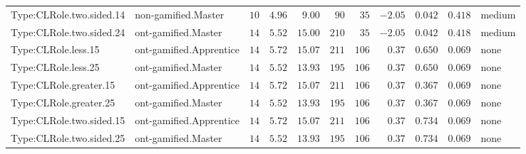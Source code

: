\documentclass[6pt,a4paper]{article}
\begin{document}
{\begin{longtable}{llrrrrrrrrl}
Type:CLRole.two.sided.14&non-gamified.Master&$10$&$4.96$&$ 9.00$&$ 90$&$ 35$&$-2.05$&$0.042$&$0.418$&medium\tabularnewline
Type:CLRole.two.sided.24&ont-gamified.Master&$14$&$5.52$&$15.00$&$210$&$ 35$&$-2.05$&$0.042$&$0.418$&medium\tabularnewline
Type:CLRole.less.15&ont-gamified.Apprentice&$14$&$5.72$&$15.07$&$211$&$106$&$ 0.37$&$0.650$&$0.069$&none\tabularnewline
Type:CLRole.less.25&ont-gamified.Master&$14$&$5.52$&$13.93$&$195$&$106$&$ 0.37$&$0.650$&$0.069$&none\tabularnewline
Type:CLRole.greater.15&ont-gamified.Apprentice&$14$&$5.72$&$15.07$&$211$&$106$&$ 0.37$&$0.367$&$0.069$&none\tabularnewline
Type:CLRole.greater.25&ont-gamified.Master&$14$&$5.52$&$13.93$&$195$&$106$&$ 0.37$&$0.367$&$0.069$&none\tabularnewline
\newpage
Type:CLRole.two.sided.15&ont-gamified.Apprentice&$14$&$5.72$&$15.07$&$211$&$106$&$ 0.37$&$0.734$&$0.069$&none\tabularnewline
Type:CLRole.two.sided.25&ont-gamified.Master&$14$&$5.52$&$13.93$&$195$&$106$&$ 0.37$&$0.734$&$0.069$&none\tabularnewline
\hline
\end{longtable}}
\end{document}
